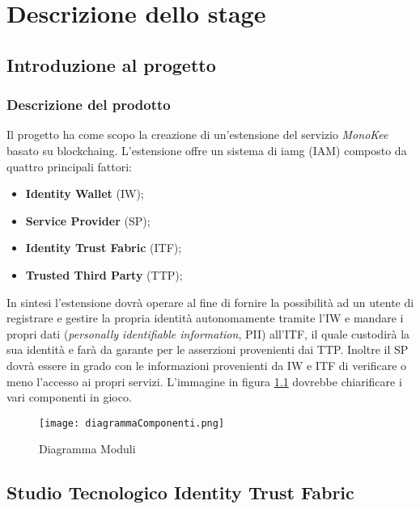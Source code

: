 
\chapter{Descrizione dello stage}
\label{cap:descrizione-stage}



\section{Introduzione al progetto}
\subsection{Descrizione del prodotto}
Il progetto ha come scopo la creazione di un’estensione del servizio \textit{MonoKee} basato su \gls{blockchaing}. L’estensione offre un sistema di \gls{iamg} (IAM) composto da quattro principali fattori:
    \begin{itemize}
        \item \textbf{Identity Wallet} (IW);
        \item \textbf{Service Provider} (SP);
        \item \textbf{Identity Trust Fabric} (ITF);
        \item \textbf{Trusted Third Party} (TTP);
    \end{itemize} 
In sintesi l’estensione dovrà operare al fine di fornire la possibilità ad un utente di registrare e gestire la propria identità autonomamente tramite l’IW e mandare i propri dati (\textit{personally identifiable information}, PII) all’ITF, il quale custodirà la sua identità e farà da garante per le asserzioni provenienti dai TTP. Inoltre il SP dovrà essere in grado con le informazioni provenienti da IW e ITF di verificare o meno l’accesso ai propri servizi.
L'immagine in figura \ref{fig:diag-mod1} dovrebbe chiarificare i vari componenti in gioco.
\begin{figure}[!h]
    \centering
    \texttt{[image: diagrammaComponenti.png]} 
    \caption{Diagramma Moduli}
    \label{fig:diag-mod1} 
\end{figure}
\section{Studio Tecnologico Identity Trust Fabric}

